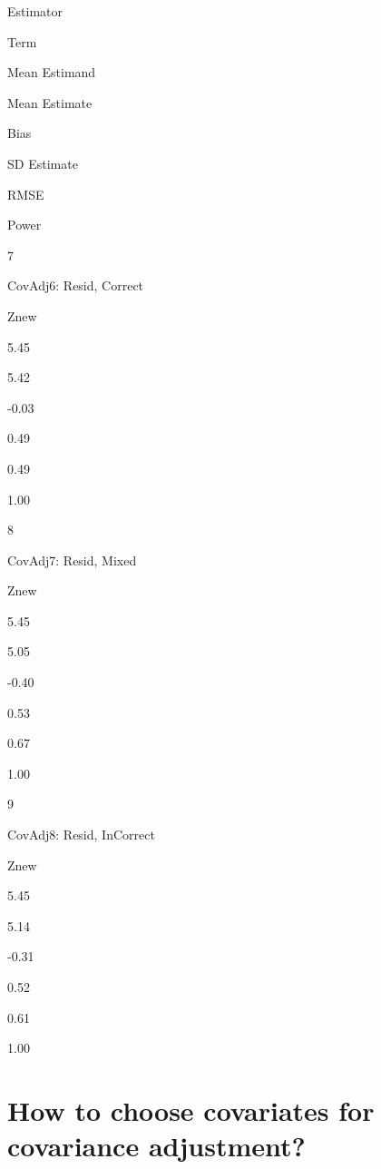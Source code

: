 \documentclass[
  12pt,
]{book}
\newenvironment{Shaded}{\begin{snugshade}}{\end{snugshade}}
\newcommand{\CommentTok}[1]{\textcolor[rgb]{0.56,0.35,0.01}{\textit{#1}}}
\newcommand{\DecValTok}[1]{\textcolor[rgb]{0.00,0.00,0.81}{#1}}
\newcommand{\KeywordTok}[1]{\textcolor[rgb]{0.13,0.29,0.53}{\textbf{#1}}}
\newcommand{\NormalTok}[1]{#1}
\newcommand{\OperatorTok}[1]{\textcolor[rgb]{0.81,0.36,0.00}{\textbf{#1}}}
\theoremstyle{definition}
\theoremstyle{definition}
\theoremstyle{definition}
\theoremstyle{remark}
\begin{document}
\begin{Shaded}
\end{Shaded}

Estimator

Term

Mean Estimand

Mean Estimate

Bias

SD Estimate

RMSE

Power

7

CovAdj6: Resid, Correct

Znew

5.45

5.42

-0.03

0.49

0.49

1.00

8

CovAdj7: Resid, Mixed

Znew

5.45

5.05

-0.40

0.53

0.67

1.00

9

CovAdj8: Resid, InCorrect

Znew

5.45

5.14

-0.31

0.52

0.61

1.00

\hypertarget{how-to-choose-covariates-for-covariance-adjustment}{%
\section{How to choose covariates for covariance
adjustment?}\label{how-to-choose-covariates-for-covariance-adjustment}}
\end{document}
